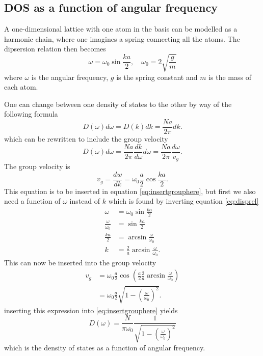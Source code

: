 \documentclass[11pt]{amsart}
\begin{document}
\subsection{DOS as a function of angular frequency}
A one-dimensional lattice with one atom in the basis can be modelled as a harmonic chain, where one imagines a spring connecting all the atoms. The dipsersion relation then becomes
\begin{equation}
\label{eq:disprel}
\omega = \omega_0\sin{\frac{ka}{2}}, \quad \omega_0 = 2\sqrt{\frac{g}{m}}
\end{equation}
where $\omega$ is the angular frequency, $g$ is the spring constant and $m$ is the mass of each atom.

One can change between one density of states to the other by way of the following formula
\begin{equation}
D(\omega)d\omega = D(k)dk = \frac{Na}{2\pi}dk.
\end{equation}
which can be rewritten to include the group velocity
\begin{equation}
\label{eq:insertgrouphere}
D(\omega)d\omega = \frac{Na}{2\pi}\frac{dk}{d\omega}d\omega = \frac{Na}{2\pi}\frac{d\omega}{v_g}.
\end{equation}
The group velocity is
\begin{equation}
\label{eq:groupvel2}
v_g = \frac{dw}{dk} = \omega_0\frac{a}{2} \cos{\frac{ka}{2}}.
\end{equation}
This equation is to be inserted in equation \ref{eq:insertgrouphere}, but first we also need a function of $\omega$ instead of $k$ which is found by inverting equation \ref{eq:disprel}
\begin{align*}
\omega &= \omega_0\sin{\frac{ka}{2}} \\
\frac{\omega}{\omega_0} &= \sin{\frac{ka}{2}} \\
\frac{ka}{2} &= \arcsin{\frac{\omega}{\omega_0}} \\
k &= \frac{2}{a}\arcsin{\frac{\omega}{\omega_0}}.
\end{align*}
This can now be inserted into the group velocity
\begin{align*}
v_g &= \omega_0\frac{a}{2}\cos\left(\frac{a}{2}\frac{2}{a}\arcsin\frac{\omega}{\omega_0} \right) \\
	&= \omega_0\frac{a}{2}\sqrt{1-\left(\frac{\omega}{\omega_0}\right)^2}.
\end{align*}
inserting this expression into \ref{eq:insertgrouphere} yields
\begin{equation}
D(\omega) = \frac{N}{\pi\omega_0}\frac{1}{\sqrt{1-\left(\frac{\omega}{\omega_0}\right)^2}}
\end{equation}
which is the density of states as a function of angular frequency.
\end{document}
